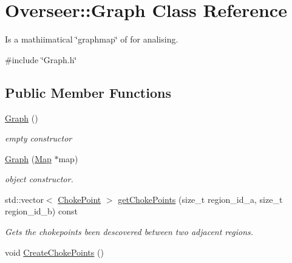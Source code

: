 \hypertarget{classOverseer_1_1Graph}{}\section{Overseer\+:\+:Graph Class Reference}
\label{classOverseer_1_1Graph}


Is a mathiimatical \char`\"{}graphmap\char`\"{} of for analising.  




{\ttfamily \#include \char`\"{}Graph.\+h\char`\"{}}

\subsection*{Public Member Functions}
\begin{DoxyCompactItemize}
\item 
\hyperlink{classOverseer_1_1Graph_a8d8f7394a8403b305682d19e72fe2678}{Graph} ()\hypertarget{classOverseer_1_1Graph_a8d8f7394a8403b305682d19e72fe2678}{}\label{classOverseer_1_1Graph_a8d8f7394a8403b305682d19e72fe2678}

\begin{DoxyCompactList}\small\item\em empty constructor \end{DoxyCompactList}\item 
\hyperlink{classOverseer_1_1Graph_af9efde8054cddf829f36a66ff8df5e8b}{Graph} (\hyperlink{classOverseer_1_1Map}{Map} $\ast$map)
\begin{DoxyCompactList}\small\item\em object constructor. \end{DoxyCompactList}\item 
std\+::vector$<$ \hyperlink{classOverseer_1_1ChokePoint}{Choke\+Point} $>$ \hyperlink{classOverseer_1_1Graph_a066ffec487ded799cd8894cd870cabc8}{get\+Choke\+Points} (size\+\_\+t region\+\_\+id\+\_\+a, size\+\_\+t region\+\_\+id\+\_\+b) const 
\begin{DoxyCompactList}\small\item\em Gets the chokepoints been descovered between two adjacent regions. \end{DoxyCompactList}\item 
void \hyperlink{classOverseer_1_1Graph_abc6459d9a554bdbfbe7fdfb87b3177cd}{Create\+Choke\+Points} ()\hypertarget{classOverseer_1_1Graph_abc6459d9a554bdbfbe7fdfb87b3177cd}{}\label{classOverseer_1_1Graph_abc6459d9a554bdbfbe7fdfb87b3177cd}


\end{DoxyCompactItemize}
